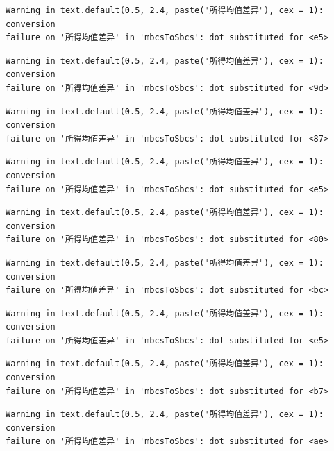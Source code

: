 \documentclass[
  letterpaper,
  DIV=11,
  numbers=noendperiod]{scrreprt}
\begin{document}
\begin{verbatim}
Warning in text.default(0.5, 2.4, paste("所得均值差异"), cex = 1): conversion
failure on '所得均值差异' in 'mbcsToSbcs': dot substituted for <e5>
\end{verbatim}

\begin{verbatim}
Warning in text.default(0.5, 2.4, paste("所得均值差异"), cex = 1): conversion
failure on '所得均值差异' in 'mbcsToSbcs': dot substituted for <9d>
\end{verbatim}

\begin{verbatim}
Warning in text.default(0.5, 2.4, paste("所得均值差异"), cex = 1): conversion
failure on '所得均值差异' in 'mbcsToSbcs': dot substituted for <87>
\end{verbatim}

\begin{verbatim}
Warning in text.default(0.5, 2.4, paste("所得均值差异"), cex = 1): conversion
failure on '所得均值差异' in 'mbcsToSbcs': dot substituted for <e5>
\end{verbatim}

\begin{verbatim}
Warning in text.default(0.5, 2.4, paste("所得均值差异"), cex = 1): conversion
failure on '所得均值差异' in 'mbcsToSbcs': dot substituted for <80>
\end{verbatim}

\begin{verbatim}
Warning in text.default(0.5, 2.4, paste("所得均值差异"), cex = 1): conversion
failure on '所得均值差异' in 'mbcsToSbcs': dot substituted for <bc>
\end{verbatim}

\begin{verbatim}
Warning in text.default(0.5, 2.4, paste("所得均值差异"), cex = 1): conversion
failure on '所得均值差异' in 'mbcsToSbcs': dot substituted for <e5>
\end{verbatim}

\begin{verbatim}
Warning in text.default(0.5, 2.4, paste("所得均值差异"), cex = 1): conversion
failure on '所得均值差异' in 'mbcsToSbcs': dot substituted for <b7>
\end{verbatim}

\begin{verbatim}
Warning in text.default(0.5, 2.4, paste("所得均值差异"), cex = 1): conversion
failure on '所得均值差异' in 'mbcsToSbcs': dot substituted for <ae>
\end{verbatim}
\end{document}
